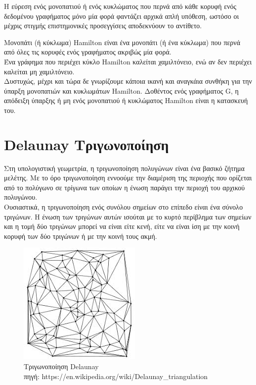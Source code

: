 \documentclass[oneside,12pt]{book}
\newenvironment{matlab}
	{\begin{figure}[hp]\centering\captionsetup{justification=centering}}
	{\end{figure}}
\theoremstyle{definition}
\begin{document}
Η εύρεση ενός μονοπατιού ή ενός κυκλώματος που περνά από κάθε κορυφή ενός δεδομένου γραφήματος μόνο μία φορά φαντάζει αρχικά απλή υπόθεση, ωστόσο οι μέχρις στιγμής επιστημονικές προσεγγίσεις αποδεκνύουν το αντίθετο.

Μονοπάτι (ή κύκλωμα) Hamilton είναι ένα μονοπάτι (ή ένα κύκλωμα) που περνά από όλες τις κορυφές ενός γραφήματος ακριβώς μία φορά. \\

Ένα γράφημα που περιέχει κύκλο Hamilton καλείται χαμιλτόνειο, ενώ αν δεν περιέχει καλείται μη χαμιλτόνειο. \\

Δυστυχώς, μέχρι και τώρα δε γνωρίζουμε κάποια ικανή και αναγκάια συνθήκη για την ύπαρξη μονοπατιών και κυκλωμάτων Hamilton. Δοθέντος ενός γραφήματος G, η απόδειξη ύπαρξης ή μη ενός μονοπατιού ή κυκλώματος Hamilton είναι η κατασκευή του. \\

\section{Delaunay Τριγωνοποίηση}

Στη υπολογιστική γεωμετρία, η τριγωνοποίηση πολυγώνων είναι ένα βασικό ζήτημα μελέτης. Με το όρο τριγωνοποίηση εννοούμε την διαμέριση της περιοχής που ορίζεται από το πολύγωνο σε τρίγωνα των οποίων η ένωση παράγει την περιοχή του αρχικού πολυγώνου. \\

Ουσιαστικά, η τριγωνοποίηση ενός συνόλου σημείων στο επίπεδο είναι ένα σύνολο τριγώνων. Η ένωση των τριγώνων αυτών ισούται με το κυρτό περίβλημα των σημείων και η τομή δύο τριγώνων μπορεί να είναι είτε κενή, είτε να είναι ίση με την κοινή κορυφή των δύο τριγώνων ή με την κοινή τους ακμή.

\begin{matlab}
	\includegraphics[scale=0.9]{images/delaunay_trianglulation.jpeg}
	\caption{Τριγωνοποίηση Delaunay \\ πηγή: https://en.wikipedia.org/wiki/Delaunay\_triangulation}
\end{matlab}
\end{document}
